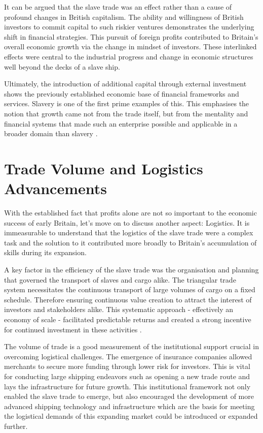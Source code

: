 \documentclass[a4paper,11pt]{article}
\begin{document}
It can be argued that the slave trade was an effect rather than a cause of profound changes in British capitalism. The ability and willingness of British investors to commit capital to such riskier ventures demonstrates the underlying shift in financial strategies. This pursuit of foreign profits contributed to Britain's overall economic growth via the change in mindset of investors. These interlinked effects were central to the industrial progress and change in economic structures well beyond the decks of a slave ship.

Ultimately, the introduction of additional capital through external investment shows the previously established economic base of financial frameworks and services. Slavery is one of the first prime examples of this. This emphasises the notion that growth came not from the trade itself, but from the mentality and financial systems that made such an enterprise possible and applicable in a broader domain than slavery \citep{harley2015}.

\section{Trade Volume and Logistics Advancements}

With the established fact that profits alone are not so important to the economic success of early Britain, let's move on to discuss another aspect: Logistics. It is immeasurable to understand that the logistics of the slave trade were a complex task and the solution to it contributed more broadly to Britain's accumulation of skills during its expansion.

A key factor in the efficiency of the slave trade was the organisation and planning that governed the transport of slaves and cargo alike. The triangular trade system necessitates the continuous transport of large volumes of cargo on a fixed schedule. Therefore ensuring continuous value creation to attract the interest of investors and stakeholders alike. This systematic approach - effectively an economy of scale - facilitated predictable returns and created a strong incentive for continued investment in these activities \citep{harley2015}.

The volume of trade is a good measurement of the institutional support crucial in overcoming logistical challenges. The emergence of insurance companies allowed merchants to secure more funding through lower risk for investors. This is vital for conducting large shipping endeavors such as opening a new trade route and lays the infrastructure for future growth. This institutional framework not only enabled the slave trade to emerge, but also encouraged the development of more advanced shipping technology and infrastructure which are the basis for meeting the logistical demands of this expanding market could be introduced or expanded further.
\end{document}
